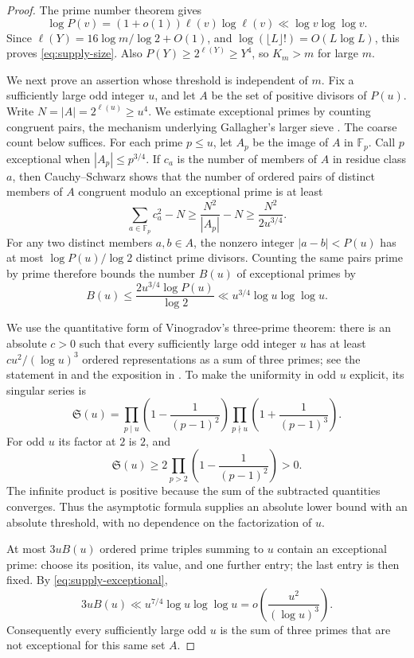 \begin{proof}
The prime number theorem \cite[p.~305, (1.1)]{Selberg1949} gives
\[
 \log P(v)=(1+o(1))\ell(v)\log\ell(v)
 \ll\log v\log\log v.
\]
Since $\ell(Y)=16\log m/\log 2+O(1)$, and
$\log(\lfloor L\rfloor!)=O(L\log L)$, this proves
\eqref{eq:supply-size}.  Also $P(Y)\geq2^{\ell(Y)}\geq Y^4$,
so $K_m>m$ for large $m$.

We next prove an assertion whose threshold is independent of $m$.
Fix a sufficiently large odd integer $u$, and let $A$ be the set of positive
divisors of $P(u)$.  Write $N=|A|=2^{\ell(u)}\geq u^4$.
We estimate exceptional primes by counting congruent pairs, the
mechanism underlying Gallagher's larger sieve \cite{Gallagher1971}.
The coarse count below suffices.
For each prime $p\leq u$, let $A_p$ be the image of $A$ in
$\mathbb F_p$.  Call $p$ exceptional when $|A_p|\leq p^{3/4}$.
If $c_a$ is the number of members of $A$ in residue class $a$, then
Cauchy--Schwarz shows that the number of ordered pairs of distinct members
of $A$ congruent modulo an exceptional prime is at least
\[
 \sum_{a\in\mathbb F_p}c_a^2-N
 \geq\frac{N^2}{|A_p|}-N
 \geq\frac{N^2}{2u^{3/4}}.
\]
For any two distinct members $a,b\in A$, the nonzero integer $|a-b|<P(u)$
has at most $\log P(u)/\log 2$ distinct prime divisors.
Counting the same pairs prime by prime therefore bounds the number $B(u)$
of exceptional primes by
\begin{equation}\label{eq:supply-exceptional}
 B(u)\leq \frac{2u^{3/4}\log P(u)}{\log 2}
 \ll u^{3/4}\log u\log\log u.
\end{equation}

We use the quantitative form of Vinogradov's three-prime theorem: there is
an absolute $c>0$ such that every sufficiently large odd integer $u$ has
at least $cu^2/(\log u)^3$ ordered representations as a sum of three
primes; see the statement in \cite[(1)--(2)]{Kumchev1997}
and the exposition in \cite[Theorem~1 and Section~3.1]{KumchevTolev2005}.
To make the uniformity in odd $u$ explicit, its singular series is
\[
 \mathfrak S(u)=
 \prod_{p\mid u}\left(1-\frac{1}{(p-1)^2}\right)
 \prod_{p\nmid u}\left(1+\frac{1}{(p-1)^3}\right).
\]
For odd $u$ its factor at $2$ is $2$, and
\[
 \mathfrak S(u)\geq
 2\prod_{p>2}\left(1-\frac{1}{(p-1)^2}\right)>0.
\]
The infinite product is positive because the sum of the subtracted
quantities converges.  Thus the asymptotic formula supplies an absolute
lower bound with an absolute threshold, with no dependence on the
factorization of $u$.

At most $3uB(u)$ ordered prime triples summing to $u$ contain an
exceptional prime: choose its position, its value, and one further entry;
the last entry is then fixed.  By \eqref{eq:supply-exceptional},
\[
 3uB(u)\ll u^{7/4}\log u\log\log u
       =o\left(\frac{u^2}{(\log u)^3}\right).
\]
Consequently every sufficiently large odd $u$ is the sum of three primes
that are not exceptional for this same set $A$.


\end{proof}
